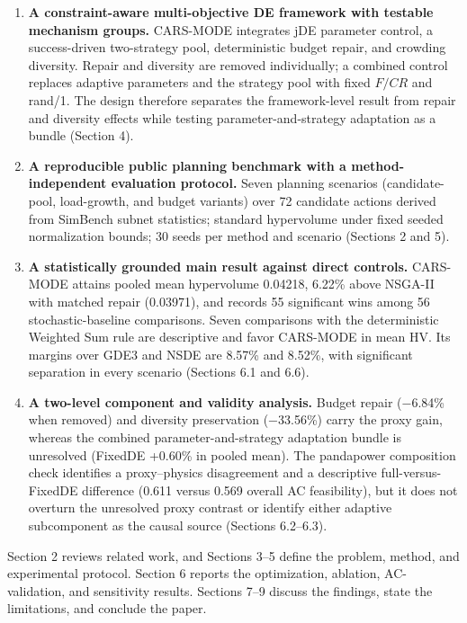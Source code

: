 \documentclass[
  10pt,
  a4paper,
]{article}
\providecommand{\tightlist}{%
  \setlength{\itemsep}{0pt}\setlength{\parskip}{0pt}}
\begin{document}
\begin{enumerate}
\def\labelenumi{\arabic{enumi}.}
\tightlist
\item
  \textbf{A constraint-aware multi-objective DE framework with testable
  mechanism groups.} CARS-MODE integrates jDE parameter control, a
  success-driven two-strategy pool, deterministic budget repair, and
  crowding diversity. Repair and diversity are removed individually; a
  combined control replaces adaptive parameters and the strategy pool
  with fixed \(F/CR\) and rand/1. The design therefore separates the
  framework-level result from repair and diversity effects while testing
  parameter-and-strategy adaptation as a bundle (Section 4).
\item
  \textbf{A reproducible public planning benchmark with a
  method-independent evaluation protocol.} Seven planning scenarios
  (candidate-pool, load-growth, and budget variants) over 72 candidate
  actions derived from SimBench subnet statistics; standard hypervolume
  under fixed seeded normalization bounds; 30 seeds per method and
  scenario (Sections 2 and 5).
\item
  \textbf{A statistically grounded main result against direct controls.}
  CARS-MODE attains pooled mean hypervolume 0.04218, 6.22\% above
  NSGA-II with matched repair (0.03971), and records 55 significant wins
  among 56 stochastic-baseline comparisons. Seven comparisons with the
  deterministic Weighted Sum rule are descriptive and favor CARS-MODE in
  mean HV. Its margins over GDE3 and NSDE are 8.57\% and 8.52\%, with
  significant separation in every scenario (Sections 6.1 and 6.6).
\item
  \textbf{A two-level component and validity analysis.} Budget repair
  (−6.84\% when removed) and diversity preservation (−33.56\%) carry the
  proxy gain, whereas the combined parameter-and-strategy adaptation
  bundle is unresolved (FixedDE +0.60\% in pooled mean). The pandapower
  composition check identifies a proxy--physics disagreement and a
  descriptive full-versus-FixedDE difference (0.611 versus 0.569 overall
  AC feasibility), but it does not overturn the unresolved proxy
  contrast or identify either adaptive subcomponent as the causal source
  (Sections 6.2--6.3).
\end{enumerate}

Section 2 reviews related work, and Sections 3--5 define the problem,
method, and experimental protocol. Section 6 reports the optimization,
ablation, AC-validation, and sensitivity results. Sections 7--9 discuss
the findings, state the limitations, and conclude the paper.
\end{document}
